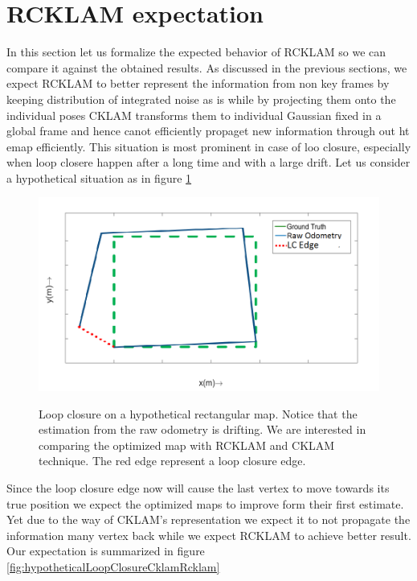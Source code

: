 \section{RCKLAM expectation}
\label{sec:RCKLAMExpectation}
In this section let us formalize the expected behavior of RCKLAM so we can compare it against the obtained results. As discussed in the previous sections, we expect RCKLAM to better represent the information from non key frames by keeping distribution of integrated noise as is while by projecting them onto the individual poses CKLAM transforms them to individual Gaussian fixed in a global frame and hence canot efficiently propaget new information through out ht emap efficiently. This situation is most prominent in case of loo closure, especially when loop closere happen after a long time and with a large drift. Let us consider a hypothetical situation as in figure \ref{fig:hypotheticalLoopClosure}
\begin{figure}
	\centering
		\includegraphics[width=1.00\textwidth]{images/hypotheticalLoopClosure.png}
	\label{fig:hypotheticalLoopClosure}
  \caption{Loop closure on a hypothetical rectangular map. Notice that the estimation from the raw odometry is drifting. We are interested in comparing the optimized map with RCKLAM and CKLAM technique. The red edge represent a loop closure edge.}
\end{figure}
Since the loop closure edge now will cause the last vertex to move towards its true position we expect the optimized maps to improve form their first estimate. Yet due to the way of CKLAM's representation we expect it to not propagate the information many vertex back while we expect RCKLAM to achieve better result. Our expectation is summarized in figure \ref{fig:hypotheticalLoopClosureCklamRcklam}

